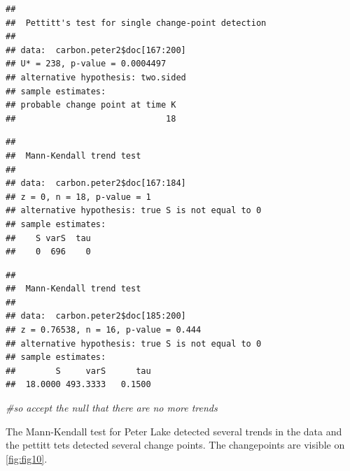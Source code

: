 \documentclass[12pt,]{article}
\newenvironment{Shaded}{\begin{snugshade}}{\end{snugshade}}
\newcommand{\KeywordTok}[1]{\textcolor[rgb]{0.13,0.29,0.53}{\textbf{#1}}}
\newcommand{\DecValTok}[1]{\textcolor[rgb]{0.00,0.00,0.81}{#1}}
\newcommand{\CommentTok}[1]{\textcolor[rgb]{0.56,0.35,0.01}{\textit{#1}}}
\newcommand{\OperatorTok}[1]{\textcolor[rgb]{0.81,0.36,0.00}{\textbf{#1}}}
\newcommand{\NormalTok}[1]{#1}
\begin{document}
\begin{verbatim}
## 
##  Pettitt's test for single change-point detection
## 
## data:  carbon.peter2$doc[167:200]
## U* = 238, p-value = 0.0004497
## alternative hypothesis: two.sided
## sample estimates:
## probable change point at time K 
##                              18
\end{verbatim}

\begin{Shaded}
\end{Shaded}

\begin{verbatim}
## 
##  Mann-Kendall trend test
## 
## data:  carbon.peter2$doc[167:184]
## z = 0, n = 18, p-value = 1
## alternative hypothesis: true S is not equal to 0
## sample estimates:
##    S varS  tau 
##    0  696    0
\end{verbatim}

\begin{Shaded}
\end{Shaded}

\begin{verbatim}
## 
##  Mann-Kendall trend test
## 
## data:  carbon.peter2$doc[185:200]
## z = 0.76538, n = 16, p-value = 0.444
## alternative hypothesis: true S is not equal to 0
## sample estimates:
##        S     varS      tau 
##  18.0000 493.3333   0.1500
\end{verbatim}

\begin{Shaded}
\begin{Highlighting}[]
\CommentTok{#so accept the null that there are no more trends}
\end{Highlighting}
\end{Shaded}

The Mann-Kendall test for Peter Lake detected several trends in the data
and the pettitt tets detected several change points. The changepoints
are visible on \autoref{fig:fig10}.
\end{document}
